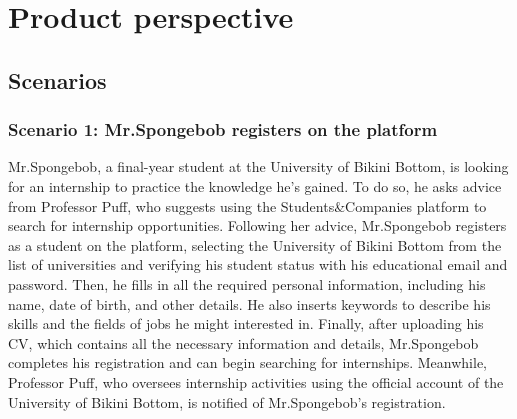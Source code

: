 \renewcommand{\thesection}{\Alph{section}}
\section{Product perspective}\label{sec:product_perspective}
\subsection{Scenarios}\label{subsec:scenarios}
\subsubsection{Scenario 1: Mr.Spongebob registers on the platform}\label{subsubsec:scenario_1}
Mr.Spongebob, a final-year student at the University of Bikini Bottom, is looking for an internship to practice the knowledge he's gained. 
To do so, he asks advice from Professor Puff, who suggests using the Students\&Companies platform to search for internship opportunities.
Following her advice, Mr.Spongebob registers as a student on the platform, selecting the University of Bikini Bottom from the list of 
universities and verifying his student status with his educational email and password. Then, he fills in all the required personal information,
including his name, date of birth, and other details. He also inserts keywords to describe his skills and the fields of jobs he might interested 
in. Finally, after uploading his CV, which contains all the necessary information and details, Mr.Spongebob completes his registration and 
can begin searching for internships. Meanwhile, Professor Puff, who oversees internship activities using the official account of the University of 
Bikini Bottom, is notified of Mr.Spongebob's registration.

